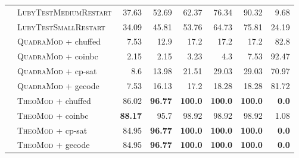 \documentclass{book}
\begin{document}
\begin{table}[]
\begin{tabular}{@{}ll rr rr rr@{}}
& \textsc{LubyTestMediumRestart}   & 37.63 & 52.69 & 62.37 & 76.34 & 90.32 & 9.68 \\
& \textsc{LubyTestSmallRestart}   & 34.09 & 45.81 & 53.76 & 64.73 & 75.81 & 24.19 \\
& \textsc{QuadraMod} + chuffed   & 7.53 & 12.9 & 17.2 & 17.2 & 17.2 & 82.8 \\
& \textsc{QuadraMod} + coinbc   & 2.15 & 2.15 & 3.23 & 4.3 & 7.53 & 92.47 \\
& \textsc{QuadraMod} + cp-sat   & 8.6 & 13.98 & 21.51 & 29.03 & 29.03 & 70.97 \\
& \textsc{QuadraMod} + gecode   & 7.53 & 16.13 & 17.2 & 18.28 & 18.28 & 81.72 \\
& \textsc{TheoMod} + chuffed   & 86.02 & \bf 96.77 & \bf 100.0 & \bf 100.0 & \bf 100.0 &  \bf 0.0 \\
& \textsc{TheoMod} + coinbc   & \bf 88.17 & 95.7 & 98.92 & 98.92 & 98.92 & 1.08 \\
& \textsc{TheoMod} + cp-sat   & 84.95 & \bf 96.77 & \bf 100.0 & \bf 100.0 & \bf 100.0 &  \bf 0.0 \\
& \textsc{TheoMod} + gecode   & 84.95 & \bf 96.77 & \bf 100.0 & \bf 100.0 & \bf 100.0 &  \bf 0.0 \\
\bottomrule\end{tabular} 

\end{table} 



\newpage
\end{document}
